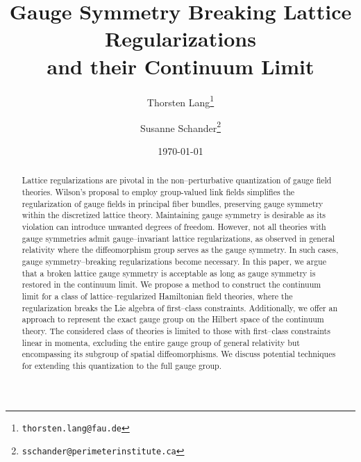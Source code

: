 \documentclass[todo]{myarticle}
\title{Gauge Symmetry Breaking Lattice Regularizations\\and their Continuum Limit}
\author[1]{Thorsten Lang\thanks{\texttt{thorsten.lang@fau.de}}}
\affil[1]{Institute for Quantum Gravity, FAU Erlangen--Nürnberg, Staudtstraße 7/B2, 91058 Erlangen, Germany}
\author[2]{Susanne Schander\thanks{\texttt{sschander@perimeterinstitute.ca}}}
\affil[2]{Perimeter Institute, 31 Caroline St N, Waterloo, ON N2L 2Y5, Canada}
\date{\today}
\begin{document}
\maketitle


\begin{abstract}
    Lattice regularizations are pivotal in the non--perturbative quantization of gauge field theories.
    Wilson's proposal to employ group-valued link fields simplifies the regularization of gauge fields in principal fiber bundles, preserving gauge symmetry within the discretized lattice theory.
    Maintaining gauge symmetry is desirable as its violation can introduce unwanted degrees of freedom.
    However, not all theories with gauge symmetries admit gauge--invariant lattice regularizations, as observed in general relativity where the diffeomorphism group serves as the gauge symmetry.
    In such cases, gauge symmetry--breaking regularizations become necessary.
    In this paper, we argue that a broken lattice gauge symmetry is acceptable as long as gauge symmetry is restored in the continuum limit.
    We propose a method to construct the continuum limit for a class of lattice--regularized Hamiltonian field theories, where the regularization breaks the Lie algebra of first--class constraints.
    Additionally, we offer an approach to represent the exact gauge group on the Hilbert space of the continuum theory. 
    The considered class of theories is limited to those with first--class constraints linear in momenta, excluding the entire gauge group of general relativity but encompassing its subgroup of spatial diffeomorphisms.
    We discuss potential techniques for extending this quantization to the full gauge group.
\end{abstract}
\tableofcontents*






\printbibliography
\end{document}
